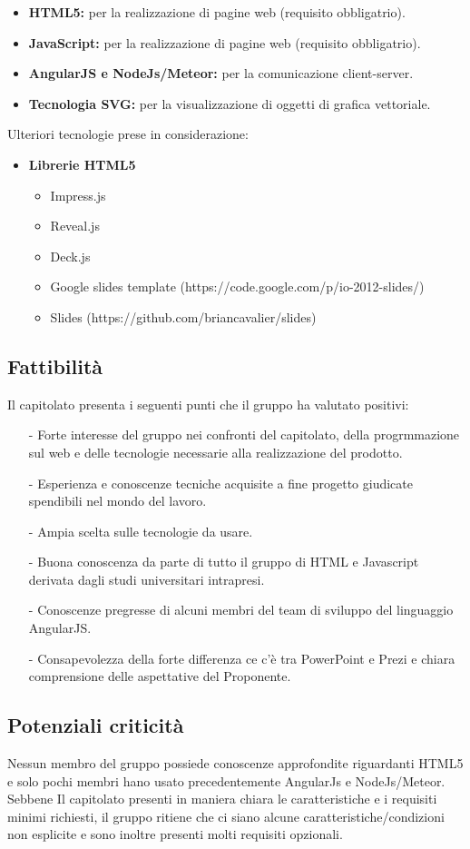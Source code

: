 \begin{itemize}
	\item \textbf{HTML5:} per la realizzazione di pagine web (requisito obbligatrio).
	\item \textbf{JavaScript:} per la realizzazione di pagine web (requisito obbligatrio).
	\item \textbf{AngularJS e NodeJs/Meteor:} per la comunicazione client-server.
	\item \textbf{Tecnologia SVG:} per la visualizzazione di oggetti di grafica vettoriale.
\end{itemize}
Ulteriori tecnologie prese in considerazione:
\begin{itemize}
	\item \textbf{Librerie HTML5}
	\begin{itemize}
		\item Impress.js
		\item Reveal.js
		\item Deck.js
		\item Google slides template (https://code.google.com/p/io-2012-slides/)
		\item Slides (https://github.com/briancavalier/slides)
	\end{itemize}
\end{itemize}

\subsection{Fattibilità}
Il capitolato presenta i seguenti punti che il gruppo ha valutato positivi:
\begin{itemize}
	\item[-] Forte interesse del gruppo nei confronti del capitolato, della progrmmazione sul web e delle tecnologie necessarie alla realizzazione del prodotto.
	\item[-] Esperienza e conoscenze tecniche acquisite a fine progetto giudicate spendibili nel mondo del lavoro.
	\item[-] Ampia scelta sulle tecnologie da usare.
	\item[-] Buona conoscenza da parte di tutto il gruppo di HTML e Javascript derivata dagli studi universitari intrapresi.
	\item[-] Conoscenze pregresse di alcuni membri del team di sviluppo del linguaggio AngularJS.
	\item[-] Consapevolezza della forte differenza ce c'è tra PowerPoint e Prezi e chiara comprensione delle aspettative del Proponente.
\end{itemize}

\subsection{Potenziali criticità}
 
Nessun membro del gruppo possiede conoscenze approfondite riguardanti HTML5 e solo pochi membri hano usato precedentemente AngularJs e NodeJs/Meteor. Sebbene Il capitolato presenti in maniera chiara le caratteristiche e i requisiti minimi richiesti, il gruppo ritiene che ci siano alcune caratteristiche/condizioni non esplicite e sono inoltre presenti molti requisiti opzionali.